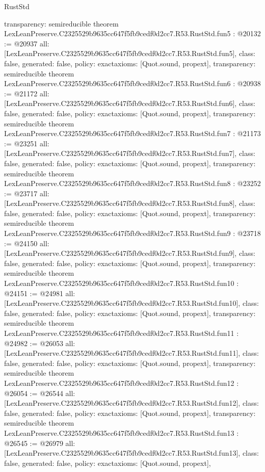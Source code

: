 \begin{lexlean}{RustStd}
\begin{coremodule}
{  transparency: semireducible
}
theorem LexLeanPreserve.C2325529b9635cc647f5fb9cedf0d2cc7.R53.RustStd.fun5 : @20132 := @20937 {
  all: [LexLeanPreserve.C2325529b9635cc647f5fb9cedf0d2cc7.R53.RustStd.fun5],
  class: false,
  generated: false,
  policy: exact{axioms: [Quot.sound, propext]},
  transparency: semireducible
}
theorem LexLeanPreserve.C2325529b9635cc647f5fb9cedf0d2cc7.R53.RustStd.fun6 : @20938 := @21172 {
  all: [LexLeanPreserve.C2325529b9635cc647f5fb9cedf0d2cc7.R53.RustStd.fun6],
  class: false,
  generated: false,
  policy: exact{axioms: [Quot.sound, propext]},
  transparency: semireducible
}
theorem LexLeanPreserve.C2325529b9635cc647f5fb9cedf0d2cc7.R53.RustStd.fun7 : @21173 := @23251 {
  all: [LexLeanPreserve.C2325529b9635cc647f5fb9cedf0d2cc7.R53.RustStd.fun7],
  class: false,
  generated: false,
  policy: exact{axioms: [Quot.sound, propext]},
  transparency: semireducible
}
theorem LexLeanPreserve.C2325529b9635cc647f5fb9cedf0d2cc7.R53.RustStd.fun8 : @23252 := @23717 {
  all: [LexLeanPreserve.C2325529b9635cc647f5fb9cedf0d2cc7.R53.RustStd.fun8],
  class: false,
  generated: false,
  policy: exact{axioms: [Quot.sound, propext]},
  transparency: semireducible
}
theorem LexLeanPreserve.C2325529b9635cc647f5fb9cedf0d2cc7.R53.RustStd.fun9 : @23718 := @24150 {
  all: [LexLeanPreserve.C2325529b9635cc647f5fb9cedf0d2cc7.R53.RustStd.fun9],
  class: false,
  generated: false,
  policy: exact{axioms: [Quot.sound, propext]},
  transparency: semireducible
}
theorem LexLeanPreserve.C2325529b9635cc647f5fb9cedf0d2cc7.R53.RustStd.fun10 : @24151 := @24981 {
  all: [LexLeanPreserve.C2325529b9635cc647f5fb9cedf0d2cc7.R53.RustStd.fun10],
  class: false,
  generated: false,
  policy: exact{axioms: [Quot.sound, propext]},
  transparency: semireducible
}
theorem LexLeanPreserve.C2325529b9635cc647f5fb9cedf0d2cc7.R53.RustStd.fun11 : @24982 := @26053 {
  all: [LexLeanPreserve.C2325529b9635cc647f5fb9cedf0d2cc7.R53.RustStd.fun11],
  class: false,
  generated: false,
  policy: exact{axioms: [Quot.sound, propext]},
  transparency: semireducible
}
theorem LexLeanPreserve.C2325529b9635cc647f5fb9cedf0d2cc7.R53.RustStd.fun12 : @26054 := @26544 {
  all: [LexLeanPreserve.C2325529b9635cc647f5fb9cedf0d2cc7.R53.RustStd.fun12],
  class: false,
  generated: false,
  policy: exact{axioms: [Quot.sound, propext]},
  transparency: semireducible
}
theorem LexLeanPreserve.C2325529b9635cc647f5fb9cedf0d2cc7.R53.RustStd.fun13 : @26545 := @26979 {
  all: [LexLeanPreserve.C2325529b9635cc647f5fb9cedf0d2cc7.R53.RustStd.fun13],
  class: false,
  generated: false,
  policy: exact{axioms: [Quot.sound, propext]},
}
\end{coremodule}
\end{lexlean}
